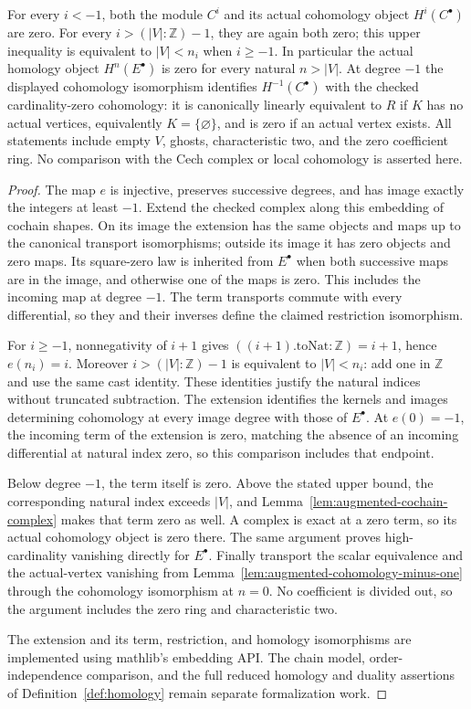 \begin{lemma}
For every $i<-1$, both the module $C^i$ and its actual cohomology object
$H^i(C^\bullet)$ are zero. For every
$i>(|V|:\mathbb Z)-1$, they are again both zero; this upper inequality
is equivalent to $|V|<n_i$ when $i\geq-1$. In particular the actual
homology object $H^n(E^\bullet)$ is zero for every natural $n>|V|$.
At degree $-1$ the displayed cohomology isomorphism identifies
$H^{-1}(C^\bullet)$ with the checked cardinality-zero cohomology:
it is canonically linearly equivalent to $R$ if $K$ has no actual
vertices, equivalently $K=\{\varnothing\}$, and is zero if an actual
vertex exists. All statements include empty $V$, ghosts, characteristic
two, and the zero coefficient ring. No comparison with the Cech complex
or local cohomology is asserted here.
\end{lemma}
\begin{proof}
\leanok
The map $e$ is injective, preserves successive degrees, and has image
exactly the integers at least $-1$. Extend the checked complex along this
embedding of cochain shapes. On its image the extension has the same
objects and maps up to the canonical transport isomorphisms; outside its
image it has zero objects and zero maps. Its square-zero law is inherited
from $E^\bullet$ when both successive maps are in the image, and otherwise
one of the maps is zero. This includes the incoming map at degree $-1$.
The term transports commute with every differential, so they and their
inverses define the claimed restriction isomorphism.

For $i\geq-1$, nonnegativity of $i+1$ gives
$((i+1).\mathrm{toNat}:\mathbb Z)=i+1$, hence $e(n_i)=i$.
Moreover $i>(|V|:\mathbb Z)-1$ is equivalent to $|V|<n_i$:
add one in $\mathbb Z$ and use the same cast identity. These identities
justify the natural indices without truncated subtraction. The extension
identifies the kernels and images determining cohomology at every image
degree with those of $E^\bullet$. At $e(0)=-1$, the incoming term of the
extension is zero, matching the absence of an incoming differential at
natural index zero, so this comparison includes that endpoint.

Below degree $-1$, the term itself is zero. Above the stated upper bound,
the corresponding natural index exceeds $|V|$, and
Lemma~\ref{lem:augmented-cochain-complex} makes that term zero as well.
A complex is exact at a zero term, so its actual cohomology object is
zero there. The same argument proves high-cardinality vanishing directly
for $E^\bullet$. Finally transport the scalar equivalence and the
actual-vertex vanishing from
Lemma~\ref{lem:augmented-cohomology-minus-one} through the cohomology
isomorphism at $n=0$. No coefficient is divided out, so the argument
includes the zero ring and characteristic two.

The extension and its term, restriction, and homology isomorphisms are
implemented using mathlib's embedding API. The chain model,
order-independence comparison, and the full reduced homology and duality assertions of
Definition~\ref{def:homology} remain separate formalization work.
\end{proof}

